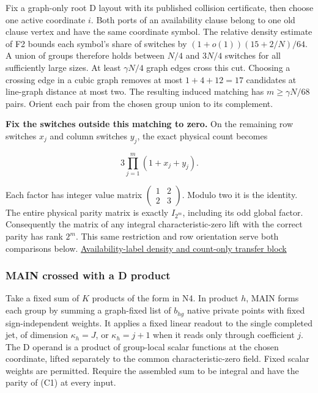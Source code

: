 \documentclass[
  11pt,
]{article}
\begin{document}
Fix a graph-only root D layout with its published collision certificate,
then choose one active coordinate \(i\). Both ports of an availability
clause belong to one old clause vertex and have the same coordinate
symbol. The relative density estimate of F2 bounds each symbol's share
of switches by \((1+o(1))(15+2/N)/64\). A union of groups therefore
holds between \(N/4\) and \(3N/4\) switches for all sufficiently large
sizes. At least \(\gamma N/4\) graph edges cross this cut. Choosing a
crossing edge in a cubic graph removes at most \(1+4+12=17\) candidates
at line-graph distance at most two. The resulting induced matching has
\(m\ge\gamma N/68\) pairs. Orient each pair from the chosen group union
to its complement.

\textbf{Fix the switches outside this matching to zero.} On the
remaining row switches \(x_j\) and column switches \(y_j\), the exact
physical count becomes

\[
                 3\prod_{j=1}^m(1+x_j+y_j).                       \tag{C2}
\]

Each factor has integer value matrix
\(\left(\begin{smallmatrix}1&2\\2&3\end{smallmatrix}\right)\). Modulo
two it is the identity. The entire physical parity matrix is exactly
\(I_{2^m}\), including its odd global factor. Consequently the matrix of
any integral characteristic-zero lift with the correct parity has rank
\(2^m\). This same restriction and row orientation serve both
comparisons below. \hyperref[v8-section-stronger-family]{Availability-label
density and count-only transfer block}

\subsubsection{MAIN crossed with a D
product}\label{v8-main-crossed-with-a-d-product}

Take a fixed sum of \(K\) products of the form in N4. In product \(h\),
MAIN forms each group by summing a graph-fixed list of \(b_{hg}\) native
private points with fixed sign-independent weights. It applies a fixed
linear readout to the single completed jet, of dimension \(\kappa_h=J\),
or \(\kappa_h=j+1\) when it reads only through coefficient \(j\). The D
operand is a product of group-local scalar functions at the chosen
coordinate, lifted separately to the common characteristic-zero field.
Fixed scalar weights are permitted. Require the assembled sum to be
integral and have the parity of (C1) at every input.
\end{document}
